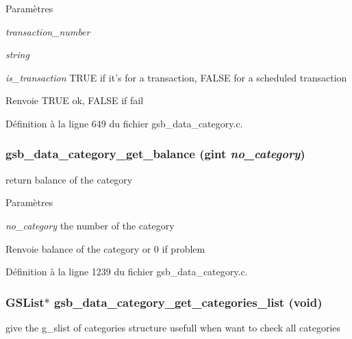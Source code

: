 \begin{DoxyParams}{Paramètres}
\item[{\em transaction\_\-number}]\item[{\em string}]\item[{\em is\_\-transaction}]TRUE if it's for a transaction, FALSE for a scheduled transaction\end{DoxyParams}
\begin{DoxyReturn}{Renvoie}
TRUE ok, FALSE if fail 
\end{DoxyReturn}


Définition à la ligne 649 du fichier gsb\_\-data\_\-category.c.

\subsubsection[{gsb\_\-data\_\-category\_\-get\_\-balance}]{ gsb\_\-data\_\-category\_\-get\_\-balance (gint {\em no\_\-category})}\label{gsb__data__category_8h_a102bf405f0b935f393efafaf1cf53503}
return balance of the category


\begin{DoxyParams}{Paramètres}
\item[{\em no\_\-category}]the number of the category\end{DoxyParams}
\begin{DoxyReturn}{Renvoie}
balance of the category or 0 if problem 
\end{DoxyReturn}


Définition à la ligne 1239 du fichier gsb\_\-data\_\-category.c.

\subsubsection[{gsb\_\-data\_\-category\_\-get\_\-categories\_\-list}]{\setlength{\rightskip}{0pt plus 5cm}GSList$\ast$ gsb\_\-data\_\-category\_\-get\_\-categories\_\-list (void)}\label{gsb__data__category_8h_a818774b4775a516ebcffe7bbea3fbaeb}
give the g\_\-slist of categories structure usefull when want to check all categories


